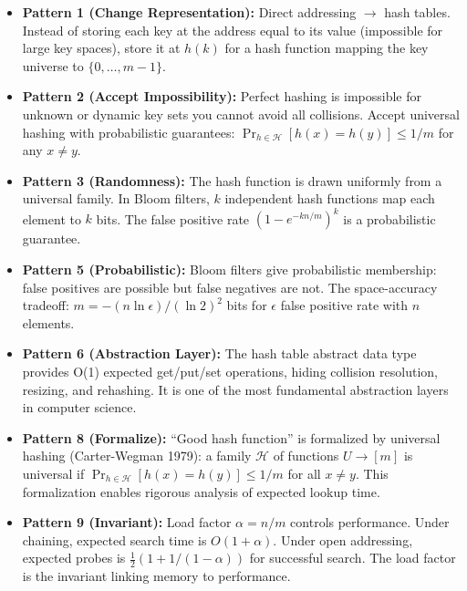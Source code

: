 \begin{itemize}
\item \textbf{Pattern 1 (Change Representation):} Direct addressing $\to$ hash tables. Instead of storing each key at the address equal to its value (impossible for large key spaces), store it at $h(k)$ for a hash function mapping the key universe to $\{0,\dots,m-1\}$.

\item \textbf{Pattern 2 (Accept Impossibility):} Perfect hashing is impossible for unknown or dynamic key sets you cannot avoid all collisions. Accept universal hashing with probabilistic guarantees: $\Pr_{h \in \mathcal{H}}[h(x) = h(y)] \le 1/m$ for any $x \neq y$.

\item \textbf{Pattern 3 (Randomness):} The hash function is drawn uniformly from a universal family. In Bloom filters, $k$ independent hash functions map each element to $k$ bits. The false positive rate $(1 - e^{-kn/m})^k$ is a probabilistic guarantee.

\item \textbf{Pattern 5 (Probabilistic):} Bloom filters give probabilistic membership: false positives are possible but false negatives are not. The space-accuracy tradeoff: $m = -(n \ln \epsilon)/(\ln 2)^2$ bits for $\epsilon$ false positive rate with $n$ elements.

\item \textbf{Pattern 6 (Abstraction Layer):} The hash table abstract data type provides O(1) expected get/put/set operations, hiding collision resolution, resizing, and rehashing. It is one of the most fundamental abstraction layers in computer science.

\item \textbf{Pattern 8 (Formalize):} ``Good hash function'' is formalized by universal hashing (Carter-Wegman 1979): a family $\mathcal{H}$ of functions $U \to [m]$ is universal if $\Pr_{h \in \mathcal{H}}[h(x) = h(y)] \le 1/m$ for all $x \neq y$. This formalization enables rigorous analysis of expected lookup time.

\item \textbf{Pattern 9 (Invariant):} Load factor $\alpha = n/m$ controls performance. Under chaining, expected search time is $O(1 + \alpha)$. Under open addressing, expected probes is $\frac{1}{2}(1 + 1/(1-\alpha))$ for successful search. The load factor is the invariant linking memory to performance.
\end{itemize}

